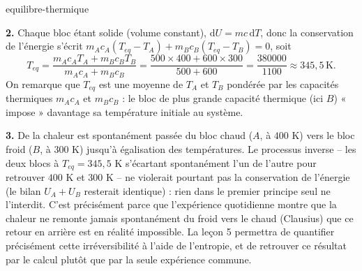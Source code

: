 \begin{exo}{equilibre-thermique}
\begin{solution}
\textbf{2.} Chaque bloc étant solide (volume constant), $\mathrm{d}U = mc\,\mathrm{d}T$, donc la conservation de l'énergie s'écrit $m_A c_A (T_{eq} - T_A) + m_B c_B (T_{eq} - T_B) = 0$, soit
$$T_{eq} = \frac{m_A c_A T_A + m_B c_B T_B}{m_A c_A + m_B c_B} = \frac{500 \times 400 + 600 \times 300}{500 + 600} = \frac{380000}{1100} \approx 345{,}5\,\text{K}.$$
On remarque que $T_{eq}$ est une moyenne de $T_A$ et $T_B$ pondérée par les capacités thermiques $m_Ac_A$ et $m_Bc_B$ : le bloc de plus grande capacité thermique (ici $B$) « impose » davantage sa température initiale au système.

\textbf{3.} De la chaleur est spontanément passée du bloc chaud ($A$, à $400$ K) vers le bloc froid ($B$, à $300$ K) jusqu'à égalisation des températures. Le processus inverse -- les deux blocs à $T_{eq} = 345{,}5$ K s'écartant spontanément l'un de l'autre pour retrouver $400$ K et $300$ K -- ne violerait pourtant pas la conservation de l'énergie (le bilan $U_A+U_B$ resterait identique) : rien dans le premier principe seul ne l'interdit. C'est précisément parce que l'expérience quotidienne montre que la chaleur ne remonte jamais spontanément du froid vers le chaud (Clausius) que ce retour en arrière est en réalité impossible. La leçon 5 permettra de quantifier précisément cette irréversibilité à l'aide de l'entropie, et de retrouver ce résultat par le calcul plutôt que par la seule expérience commune.
\end{solution}

\end{exo}

